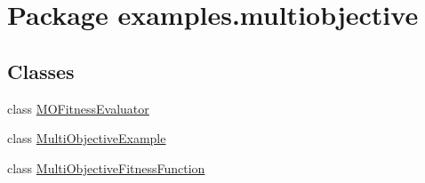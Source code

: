 \hypertarget{namespaceexamples_1_1multiobjective}{\section{Package examples.\-multiobjective}
\label{namespaceexamples_1_1multiobjective}
}
\subsection*{Classes}
\begin{DoxyCompactItemize}
\item 
class \hyperlink{classexamples_1_1multiobjective_1_1_m_o_fitness_evaluator}{M\-O\-Fitness\-Evaluator}
\item 
class \hyperlink{classexamples_1_1multiobjective_1_1_multi_objective_example}{Multi\-Objective\-Example}
\item 
class \hyperlink{classexamples_1_1multiobjective_1_1_multi_objective_fitness_function}{Multi\-Objective\-Fitness\-Function}
\end{DoxyCompactItemize}
